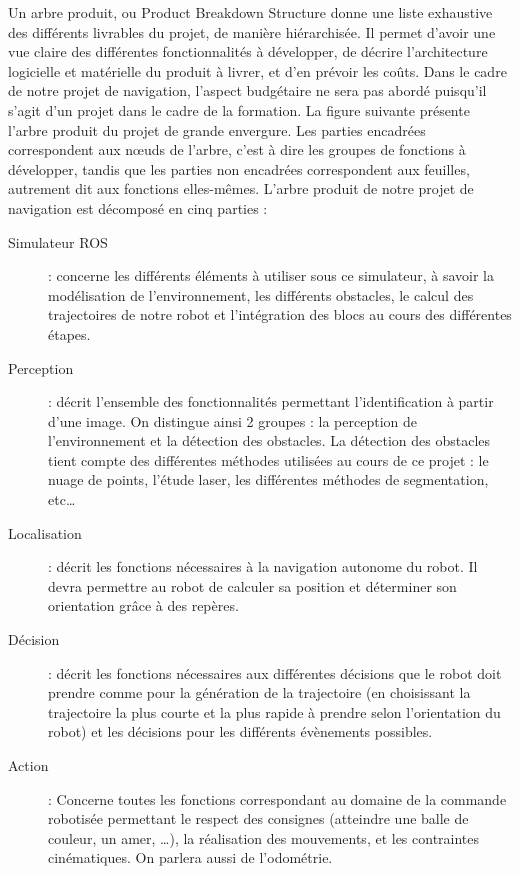\documentclass[10pt,a4paper]{article}
\begin{document}
Un arbre produit, ou Product Breakdown Structure donne une liste exhaustive des différents livrables du projet, de manière hiérarchisée. Il permet d’avoir une vue claire des différentes fonctionnalités à développer, de décrire l’architecture logicielle et matérielle du produit à livrer, et d’en prévoir les coûts. Dans le cadre de notre projet de navigation, l’aspect budgétaire ne sera pas abordé puisqu’il s’agit d’un projet dans le cadre de la formation.
La figure suivante présente l’arbre produit du projet de grande envergure. Les parties encadrées correspondent aux nœuds de l’arbre, c’est à dire les groupes de fonctions à développer, tandis que les parties non encadrées correspondent aux feuilles, autrement dit aux fonctions elles-mêmes.
L’arbre produit de notre projet de navigation est décomposé en cinq parties :
\begin{description}
\item [Simulateur ROS] : concerne les différents éléments à utiliser sous ce simulateur, à savoir la modélisation de l’environnement, les différents obstacles, le calcul des trajectoires de notre robot et l’intégration des blocs au cours des différentes étapes.
\item  [Perception] : décrit l’ensemble des fonctionnalités permettant l’identification à partir d’une image. On distingue ainsi 2 groupes : la perception de l’environnement et la détection des obstacles. La détection des obstacles tient compte des différentes méthodes utilisées au cours de ce projet : le nuage de points, l’étude laser, les différentes méthodes de segmentation, etc…
\item [Localisation] : décrit les fonctions nécessaires à la navigation autonome du robot. Il devra permettre au robot de calculer sa position et déterminer son orientation grâce à des repères.
\item [Décision] : décrit les fonctions nécessaires aux différentes décisions que le robot doit prendre comme pour la génération de la trajectoire (en choisissant la trajectoire la plus courte et la plus rapide à prendre selon l’orientation du robot) et les décisions pour les différents évènements possibles.
\item [Action] : Concerne toutes les fonctions correspondant au domaine de la commande robotisée permettant le respect des consignes (atteindre une balle de couleur, un amer, …), la réalisation des mouvements, et les contraintes cinématiques. On parlera aussi de l’odométrie.
\end{description}
\end{document}
